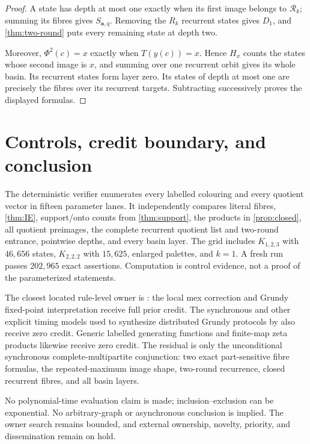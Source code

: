 \documentclass[11pt,a4paper]{amsart}
\theoremstyle{definition}
\theoremstyle{remark}
\newcommand{\PhiG}{\Phi}
\newcommand{\Rec}{\mathcal R}
\begin{document}
\begin{proof}
A state has depth at most one exactly when its first image belongs to
\(\Rec_k\); summing its fibres gives \(S_{\mathbf a,q}\).  Removing the
\(R_k\) recurrent states gives \(D_1\), and
\cref{thm:two-round} puts every remaining state at depth two.

Moreover, \(\PhiG^2(c)=x\) exactly when \(T(y(c))=x\).  Hence \(H_x\) counts
the states whose second image is \(x\), and summing over one recurrent orbit
gives its whole basin.  Its recurrent states form layer zero.  Its states of
depth at most one are precisely the fibres over its recurrent targets.
Subtracting successively proves the displayed formulas.
\end{proof}



\section{Controls, credit boundary, and conclusion}

The deterministic verifier enumerates every labelled colouring and every
quotient vector in fifteen parameter lanes.  It independently compares
literal fibres,
\cref{thm:IE}, support/onto counts from \cref{thm:support}, the products in
\cref{prop:closed}, all quotient preimages, the complete recurrent quotient
list and two-round entrance, pointwise depths, and every basin layer.  The
grid includes \(K_{1,2,3}\) with \(46{,}656\) states,
\(K_{2,2,2}\) with \(15{,}625\), enlarged palettes, and \(k=1\).
A fresh run passes \(202{,}965\) exact assertions.  Computation is control
evidence, not a proof of the parameterized statements.

The closest located rule-level owner is
\citet{HedetniemiJacobsSrimani2003}: the local mex correction and Grundy
fixed-point interpretation receive full prior credit.  The synchronous and
other explicit timing models used to synthesize distributed Grundy protocols
by \citet{FaghihEtAl2018} also receive zero credit.  Generic labelled
generating functions \cite{FlajoletSedgewick2009} and finite-map zeta
products \cite{ArtinMazur1965} likewise receive zero credit.  The residual is
only the unconditional synchronous complete-multipartite conjunction: two
exact part-sensitive fibre formulas, the repeated-maximum image shape,
two-round recurrence, closed recurrent fibres, and all basin layers.

No polynomial-time evaluation claim is made; inclusion--exclusion can be
exponential.  No arbitrary-graph or asynchronous conclusion is implied.
The owner search remains bounded, and external ownership, novelty, priority,
and dissemination remain on hold.



\end{document}

